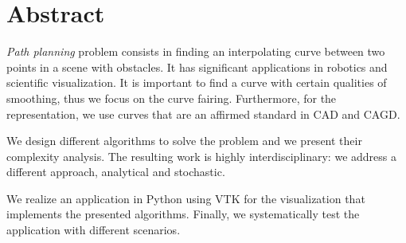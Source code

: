 \begingroup
\let\clearpage\relax
\let\cleardoublepage\relax
\let\cleardoublepage\relax

\chapter*{Abstract}
\emph{Path planning} problem consists in finding an interpolating curve
between two points in a scene with obstacles. It has significant
applications in robotics and scientific visualization. It is important to
find a curve with certain qualities of smoothing, thus we focus on the
curve fairing. Furthermore, for the representation, we use \bs curves
that are an affirmed standard in \ac{CAD} and \ac{CAGD}.

We design different algorithms to solve the problem and we present their
complexity analysis. The resulting work is highly interdisciplinary:
we address a different approach, analytical and stochastic.

We realize an application in
Python using \ac{VTK} for the visualization that implements the
presented algorithms. Finally, we systematically test the application
with different scenarios.
\endgroup			

\vfill


